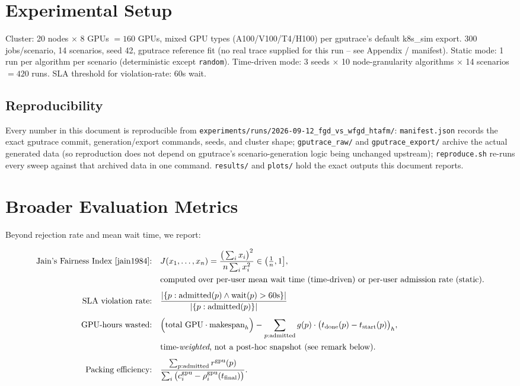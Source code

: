 \documentclass[11pt]{article}
\begin{document}
\section{Experimental Setup}
Cluster: 20 nodes $\times$ 8 GPUs $=160$ GPUs, mixed GPU types (A100/V100/T4/H100)
per gputrace's default k8s\_sim export. 300 jobs/scenario, 14 scenarios,
seed 42, gputrace reference fit (no real trace supplied for this run --
see Appendix / manifest). Static mode: 1 run per algorithm per scenario
(deterministic except \texttt{random}). Time-driven mode: 3 seeds
$\times$ 10 node-granularity algorithms $\times$ 14 scenarios $=420$ runs.
SLA threshold for violation-rate: 60s wait.

\subsection{Reproducibility}
\label{sec:repro}
Every number in this document is reproducible from
\texttt{experiments/runs/2026-09-12\_fgd\_vs\_wfgd\_htafm/}: \texttt{manifest.json}
records the exact gputrace commit, generation/export commands, seeds, and
cluster shape; \texttt{gputrace\_raw/} and \texttt{gputrace\_export/}
archive the actual generated data (so reproduction does not depend on
gputrace's scenario-generation logic being unchanged upstream);
\texttt{reproduce.sh} re-runs every sweep against that archived data in
one command. \texttt{results/} and \texttt{plots/} hold the exact outputs
this document reports.

\section{Broader Evaluation Metrics}
\label{sec:broader-metrics}
Beyond rejection rate and mean wait time, we report:

\begin{align*}
  \text{Jain's Fairness Index \cite{jain1984}:} \quad & J(x_1,\dots,x_n) = \frac{\big(\sum_i x_i\big)^2}{n \sum_i x_i^2} \in \big(\tfrac1n, 1\big], \\
  &\text{computed over per-user mean wait time (time-driven) or per-user admission rate (static).} \\[4pt]
  \text{SLA violation rate:} \quad & \frac{|\{p : \text{admitted}(p) \wedge \text{wait}(p) > 60\text{s}\}|}{|\{p : \text{admitted}(p)\}|} \\[4pt]
  \text{GPU-hours wasted:} \quad & \Big(\text{total GPU} \cdot \text{makespan}_h\Big) - \sum_{p:\text{admitted}} g(p)\cdot\big(t_{\text{done}}(p)-t_{\text{start}}(p)\big)_h, \\
  &\text{time-\emph{weighted}, not a post-hoc snapshot (see remark below).} \\[4pt]
  \text{Packing efficiency:} \quad & \frac{\sum_{p:\text{admitted}} r^{\text{gpu}}(p)}{\sum_i \big(c^{\text{gpu}}_i - \rho^{\text{gpu}}_i(t_{\text{final}})\big)}.
\end{align*}
\end{document}

